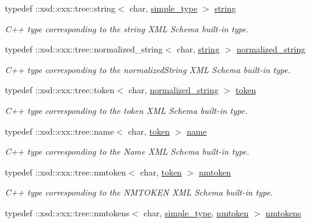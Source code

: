 \begin{DoxyCompactItemize}
typedef \+::xsd\+::cxx\+::tree\+::string$<$ char, \hyperlink{namespacexml__schema_a44789bb4367951bcf8ae867cb983324d}{simple\+\_\+type} $>$ \hyperlink{namespacexml__schema_aefbaf353f9a0043af46d23d9040ef268}{string}
\begin{DoxyCompactList}\small\item\em C++ type corresponding to the string X\+M\+L Schema built-\/in type. \end{DoxyCompactList}\item 
typedef \+::xsd\+::cxx\+::tree\+::normalized\+\_\+string$<$ char, \hyperlink{namespacexml__schema_aefbaf353f9a0043af46d23d9040ef268}{string} $>$ \hyperlink{namespacexml__schema_a429c44c2779bb6c82332127aa59c61fe}{normalized\+\_\+string}
\begin{DoxyCompactList}\small\item\em C++ type corresponding to the normalized\+String X\+M\+L Schema built-\/in type. \end{DoxyCompactList}\item 
typedef \+::xsd\+::cxx\+::tree\+::token$<$ char, \hyperlink{namespacexml__schema_a429c44c2779bb6c82332127aa59c61fe}{normalized\+\_\+string} $>$ \hyperlink{namespacexml__schema_abdb824cb755f58704a95b28f017dd0f7}{token}
\begin{DoxyCompactList}\small\item\em C++ type corresponding to the token X\+M\+L Schema built-\/in type. \end{DoxyCompactList}\item 
typedef \+::xsd\+::cxx\+::tree\+::name$<$ char, \hyperlink{namespacexml__schema_abdb824cb755f58704a95b28f017dd0f7}{token} $>$ \hyperlink{namespacexml__schema_abefc242069a8a8b837230355cbc238a1}{name}
\begin{DoxyCompactList}\small\item\em C++ type corresponding to the Name X\+M\+L Schema built-\/in type. \end{DoxyCompactList}\item 
typedef \+::xsd\+::cxx\+::tree\+::nmtoken$<$ char, \hyperlink{namespacexml__schema_abdb824cb755f58704a95b28f017dd0f7}{token} $>$ \hyperlink{namespacexml__schema_a4de61deb214b4d95f53954ccadaee326}{nmtoken}
\begin{DoxyCompactList}\small\item\em C++ type corresponding to the N\+M\+T\+O\+K\+E\+N X\+M\+L Schema built-\/in type. \end{DoxyCompactList}\item 
typedef \+::xsd\+::cxx\+::tree\+::nmtokens$<$ char, \hyperlink{namespacexml__schema_a44789bb4367951bcf8ae867cb983324d}{simple\+\_\+type}, \hyperlink{namespacexml__schema_a4de61deb214b4d95f53954ccadaee326}{nmtoken} $>$ \hyperlink{namespacexml__schema_af680cdfd739686fb9b689667435092f8}{nmtokens}

\end{DoxyCompactItemize}
